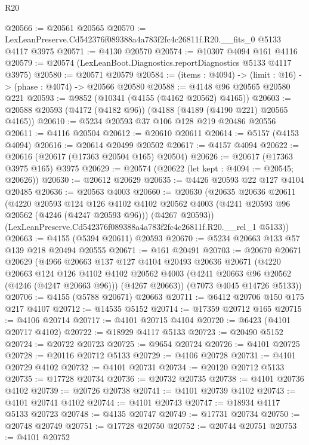 \begin{lexlean}{R20}
\begin{coremodule}
@20566 := @20561 @20565
@20570 := LexLeanPreserve.Cd542376f089388a4a783f2fc4c26811f.R20.__fits_0 @5133 @4117 @3975
@20571 := @4130 @20570
@20574 := @10307 @4094 @161 @4116
@20579 := @20574 (LexLeanBoot.Diagnostics.reportDiagnostics @5133 @4117 @3975)
@20580 := @20571 @20579
@20584 := (items : @4094) -> (limit : @16) -> (phase : @4074) -> @20566 @20580
@20588 := @4148 @96 @20565 @20580 @221
@20593 := @9852 (@10341 (@4155 (@4162 @20562) @4165))
@20603 := @20588 @20593 (@4172 (@4182 @96)) (@4188 (@4189 (@4190 @221) @20565 @4165))
@20610 := @5234 @20593 @37 @106 @128 @219 @20486 @20556
@20611 := @4116 @20504
@20612 := @20610 @20611
@20614 := @5157 (@4153 @4094)
@20616 := @20614 @20499 @20502
@20617 := @4157 @4094
@20622 := @20616 (@20617 (@17363 @20504 @165) @20504)
@20626 := @20617 (@17363 @3975 @165) @3975
@20629 := @20574 (@20622 (let kept : @4094 := @20545; @20626))
@20630 := @20612 @20629
@20635 := @4426 @20593 @22 @127 @4104 @20485
@20636 := @20563 @4003
@20660 := @20630
    (@20635
      @20636
      @20611
      (@4220
        @20593
        @124
        @126
        @4102
        @4102
        @20562
        @4003
        (@4241 @20593 @96 @20562 (@4246 (@4247 @20593 @96)))
        (@4267 @20593))
      (LexLeanPreserve.Cd542376f089388a4a783f2fc4c26811f.R20.__rel_1 @5133))
@20663 := @4155 (@5394 @20611) @20593
@20670 := @5234 @20663 @133 @57 @139 @218 @20494 @20555
@20671 := @161 @20491
@20703 := @20670
    @20671
    @20629
    (@4966
      @20663
      @137
      @127
      @4104
      @20493
      @20636
      @20671
      (@4220
        @20663
        @124
        @126
        @4102
        @4102
        @20562
        @4003
        (@4241 @20663 @96 @20562 (@4246 (@4247 @20663 @96)))
        (@4267 @20663))
      (@7073 @4045 @14726 @5133))
@20706 := @4155 (@5788 @20671) @20663
@20711 := @6412 @20706 @150 @175 @217 @4107
@20712 := @14535 @5152
@20714 := @17359 @20712 @165
@20715 := @4106 @20714
@20717 := @4101 @20715 @4104
@20720 := @6423 (@4101 @20717 @4102)
@20722 := @18929 @4117 @5133
@20723 := @20490 @5152
@20724 := @20722 @20723
@20725 := @9654 @20724
@20726 := @4101 @20725
@20728 := @20116 @20712 @5133
@20729 := @4106 @20728
@20731 := @4101 @20729 @4102
@20732 := @4101 @20731
@20734 := @20120 @20712 @5133
@20735 := @17728 @20734
@20736 := @20732 @20735
@20738 := @4101 @20736 @4102
@20739 := @20726 @20738
@20741 := @4101 @20739 @4102
@20743 := @4101 @20741 @4102
@20744 := @4101 @20743
@20747 := @18934 @4117 @5133 @20723
@20748 := @4135 @20747
@20749 := @17731 @20734
@20750 := @20748 @20749
@20751 := @17728 @20750
@20752 := @20744 @20751
@20753 := @4101 @20752

\end{coremodule}
\end{lexlean}
